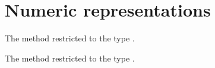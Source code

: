\section{Numeric representations}
\begin{haddockdesc}
\item[\begin{tabular}{@{}l}
ord :: Char -> Int
\end{tabular}]
{\haddockbegindoc
The  method restricted to the type .\par}
\end{haddockdesc}
\begin{haddockdesc}
\item[\begin{tabular}{@{}l}
chr :: Int -> Char
\end{tabular}]
{\haddockbegindoc
The  method restricted to the type .\par}
\end{haddockdesc}
